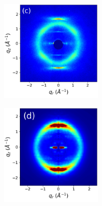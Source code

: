 \documentclass[journal=jpcbfk,manuscript=article]{achemso}
\begin{document}
\begin{figure}[!htb]
\begin{subfigure}{0.88\textwidth}
\begin{subfigure}{0.28\linewidth}
\begin{subfigure}{\textwidth}
			\end{subfigure}
	\end{subfigure}
	\begin{subfigure}{0.4\linewidth}
	\centering
			\begin{subfigure}{\textwidth}
		       		\centering
	        		\includegraphics[width=\linewidth]{WAXS_raw_jet_nocbar.pdf}
			\end{subfigure}
	\end{subfigure}
	\begin{subfigure}{0.28\linewidth}
	\centering
			\begin{subfigure}{\textwidth}
			\centering
		        	\includegraphics[width=\linewidth]{rzplot_offset_300K_jet_nocbar.pdf}

\end{subfigure}
\end{subfigure}
\end{subfigure}
\end{figure}
\end{document}
